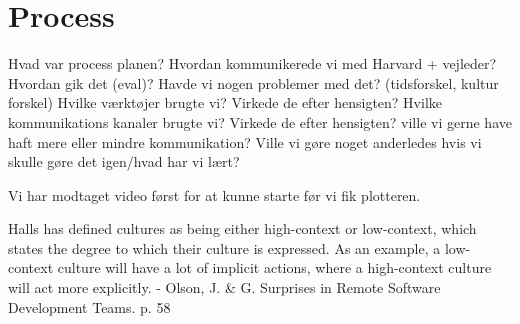 
\section{Process}

Hvad var process planen?
Hvordan kommunikerede vi med Harvard + vejleder?
Hvordan gik det (eval)?
Havde vi nogen problemer med det? (tidsforskel, kultur forskel)
Hvilke værktøjer brugte vi?
Virkede de efter hensigten?
Hvilke kommunikations kanaler brugte vi?
Virkede de efter hensigten? ville vi gerne have haft mere eller mindre kommunikation?
Ville vi gøre noget anderledes hvis vi skulle gøre det igen/hvad har vi lært?

Vi har modtaget video først for at kunne starte før vi fik plotteren.

Halls has defined cultures as being either high-context or low-context, which states the degree to which their culture is expressed. As an example, a low-context culture will have a lot of implicit actions, where a high-context culture will act more explicitly.
- Olson, J. \& G. Surprises in Remote Software Development Teams. p. 58
